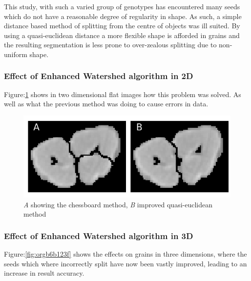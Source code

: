 \documentclass[11pt]{report}
\begin{document}
This study, with such a varied group of genotypes has encountered many seeds which do not have a reasonable degree of regularity in shape. As such, a simple distance based method of splitting from the centre of objects was ill suited. By using a quasi-euclidean distance a more flexible shape is afforded in grains and the resulting segmentation is less prone to over-zealous splitting due to non-uniform shape.

\subsubsection{Effect of Enhanced Watershed algorithm in 2D}
\label{sec:org3e19a86}

Figure:\ref{fig:org2036f94} shows in two dimensional flat images how this problem was solved. As well as what the previous method was doing to cause errors in data.
\begin{figure}[htbp]
\centering
\includegraphics[width=16cm]{./images/chess_quasi.png}
\caption{\label{fig:org2036f94}
\emph{A} showing the chessboard method, \emph{B} improved quasi-euclidean method}
\end{figure}

\clearpage
\subsubsection{Effect of Enhanced Watershed algorithm in 3D}
\label{sec:org9ef7144}

Figure:\ref{fig:orgb6b123f} shows the effects on grains in three dimensions, where the seeds which where incorrectly split have now been vastly improved, leading to an increase in result accuracy.
\end{document}
